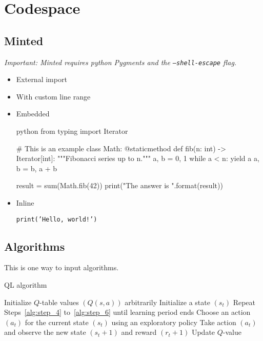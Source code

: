 \section{Codespace}
\subsection{Minted}
\emph{Important: Minted requires python Pygments and the \texttt{--shell-escape} flag.}

\begin{itemize}
  \item External import


  \item With custom line range


  \item Embedded

  \begin{code}{python}
  from typing import Iterator

  # This is an example
  class Math:
      @staticmethod
      def fib(n: int) -> Iterator[int]:
          """Fibonacci series up to n."""
          a, b = 0, 1
          while a < n:
              yield a
              a, b = b, a + b

  result = sum(Math.fib(42))
  print("The answer is {}".format(result))
  \end{code}

  \item Inline

  \texttt{print('Hello, world!')}
\end{itemize}

\subsection{Algorithms}
This is one way to input algorithms.

\begin{algorithm}[H]
  \caption{QL algorithm}
  Initialize \(Q\)-table values \((Q(s, a))\) arbitrarily\;
  Initialize a state \((s_t)\)\;
  Repeat Steps~\ref{alg:step_4} to~\ref{alg:step_6} until learning period ends\;
  Choose an action \((a_t)\) for the current state \((s_t)\) using an exploratory policy\; 
  Take action \((a_t)\) and observe the new state \((s_t + 1)\) and reward \((r_t + 1)\)\;
  Update \(Q\)-value\; 
\end{algorithm}
